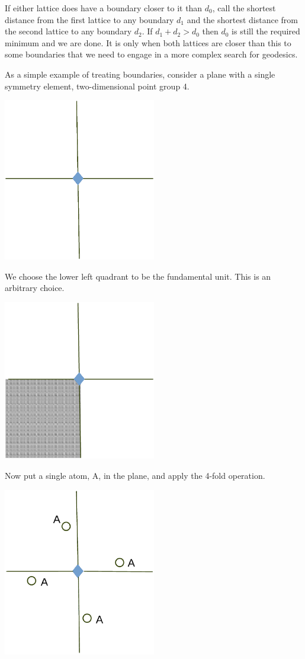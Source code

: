 \documentclass[preprint]{iucr}              %
\numberwithin{equation}{section}
\begin{document}
	If either lattice does have a boundary closer to it than
	$d_0$, call the shortest distance from the first lattice
	to any boundary $d_1$ and the shortest distance
	from the second lattice to any boundary $d_2$.  If 
	$d_1 +d_2 > d_0$ then $d_0$ is still the required
	minimum and we are done.   It is only when both lattices
	are closer than this to some boundaries that we need to
	engage in a more complex search for geodesics. 
	
	As a simple example of treating boundaries, consider a plane with a single
	symmetry element, two-dimensional point group 4.
	
	\includegraphics[width = 0.5\textwidth ]{4_1}
	
	We choose the lower left quadrant to be the fundamental unit.
    This is an arbitrary choice.
	
	\includegraphics[width = 0.5\textwidth ]{4_1_1}
	
	Now put a single atom, A, in the plane, and apply the
	4-fold operation.
	
		\includegraphics[width = 0.5\textwidth ]{4_2}
		
\end{document}
